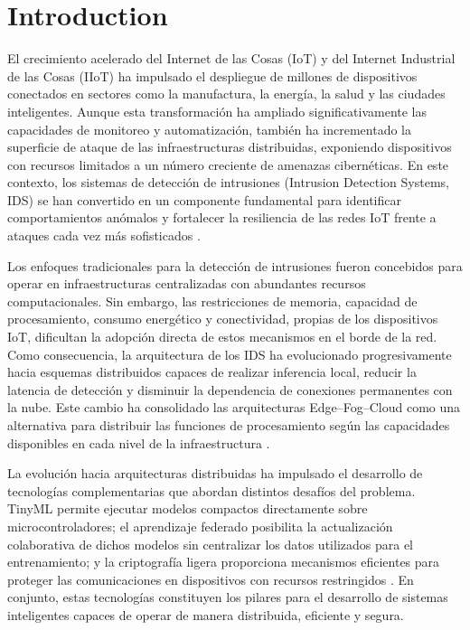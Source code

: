 \documentclass[journal,article,submit,moreauthors]{Definitions/mdpi}
\begin{document}

\section{Introduction}

El crecimiento acelerado del Internet de las Cosas (IoT) y del Internet Industrial de las Cosas (IIoT) ha impulsado el despliegue de millones de dispositivos conectados en sectores como la manufactura, la energía, la salud y las ciudades inteligentes. Aunque esta transformación ha ampliado significativamente las capacidades de monitoreo y automatización, también ha incrementado la superficie de ataque de las infraestructuras distribuidas, exponiendo dispositivos con recursos limitados a un número creciente de amenazas cibernéticas. En este contexto, los sistemas de detección de intrusiones (Intrusion Detection Systems, IDS) se han convertido en un componente fundamental para identificar comportamientos anómalos y fortalecer la resiliencia de las redes IoT frente a ataques cada vez más sofisticados \cite{Ni2024,Amanullah2020,Bagaa2020,Lim2025}.

Los enfoques tradicionales para la detección de intrusiones fueron concebidos para operar en infraestructuras centralizadas con abundantes recursos computacionales. Sin embargo, las restricciones de memoria, capacidad de procesamiento, consumo energético y conectividad, propias de los dispositivos IoT, dificultan la adopción directa de estos mecanismos en el borde de la red. Como consecuencia, la arquitectura de los IDS ha evolucionado progresivamente hacia esquemas distribuidos capaces de realizar inferencia local, reducir la latencia de detección y disminuir la dependencia de conexiones permanentes con la nube. Este cambio ha consolidado las arquitecturas Edge--Fog--Cloud como una alternativa para distribuir las funciones de procesamiento según las capacidades disponibles en cada nivel de la infraestructura \cite{SaravanaBalaji2023,Ni2024,Dini2024,Tamuka2026}.

La evolución hacia arquitecturas distribuidas ha impulsado el desarrollo de tecnologías complementarias que abordan distintos desafíos del problema. TinyML permite ejecutar modelos compactos directamente sobre microcontroladores; el aprendizaje federado posibilita la actualización colaborativa de dichos modelos sin centralizar los datos utilizados para el entrenamiento; y la criptografía ligera proporciona mecanismos eficientes para proteger las comunicaciones en dispositivos con recursos restringidos \cite{Tekin2023,Amuthadevi2025,McMahan2017,Imteaj2022,NIST800232,Kaur2025}. En conjunto, estas tecnologías constituyen los pilares para el desarrollo de sistemas inteligentes capaces de operar de manera distribuida, eficiente y segura.
\end{document}
